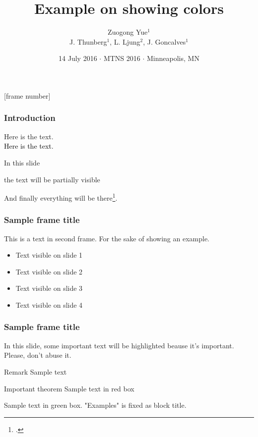 \documentclass[xcolor={dvipsnames},aspectratio=169]{beamer}
\title[]{Example on showing colors}
\subtitle{}
\author{\small Zuogong Yue$^1$\\[1ex] J. Thunberg$^1$, L. Ljung$^2$, J. Goncalves$^1$}
\institute[]{
    \begin{tabular}{ll}
       $^1$ University of Luxembourg, Luxembourg\\
       $^2$ Link\"{o}ping University, Sweden
    \end{tabular}}
\date{\footnotesize 14 July 2016 $\cdot$ MTNS 2016 $\cdot$ Minneapolis, MN}
\begin{document}
\begin{frame}
  \vspace*{1cm}
  \titlepage
\end{frame}
[frame number]   %
\setcounter{framenumber}{0}



\begin{frame}
  \frametitle{Introduction}

  \huge
  Here is the text.\\
  \textcolor{black}{Here is the text.}

\end{frame}



\begin{frame}
  In this slide \pause

  the text will be partially visible \pause

  And finally everything will be there\footcite{Yue2017}.
\end{frame}



\begin{frame}
  \frametitle{Sample frame title}
  This is a text in second frame.
  For the sake of showing an example.

  \begin{itemize}
  \item<1-> Text visible on slide 1
  \item<2-> Text visible on slide 2
  \item<3> Text visible on slide 3
  \item<4-> Text visible on slide 4
  \end{itemize}
\end{frame}



\begin{frame}
  \frametitle{Sample frame title}

  In this slide, some important text will be
  \alert{highlighted} beause it's important.
  Please, don't abuse it.

  \begin{block}{Remark}
    Sample text
  \end{block}

  \begin{alertblock}{Important theorem}
    Sample text in red box
  \end{alertblock}

  \begin{examples}
    Sample text in green box. "Examples" is fixed as block title.
  \end{examples}
\end{frame}
\end{document}
